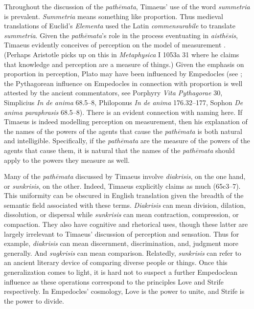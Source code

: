 Throughout the discussion of the \emph{pathēmata}, Timaeus' use of the word \emph{summetria} is prevalent. \emph{Summetria} means something like proportion. Thus medieval translations of Euclid's \emph{Elementa} used the Latin \emph{commensurabile} to translate \emph{summetria}. Given the \emph{pathēmata}'s role in the process eventuating in \emph{aisthēsis}, Timaeus evidently conceives of perception on the model of measurement \citep[155--6]{Brisson:1997qr}. (Perhaps Aristotle picks up on this in \emph{Metaphysica} I 1053a 31 where he claims that knowledge and perception are a measure of things.) Given the emphasis on proportion in perception, Plato may have been influenced by Empedocles (see \citealt{Ierodiakonou:2005fk,Ierodiakonou:2005ly}; the Pythagorean influence on Empedocles in connection with proportion is well attested by the ancient commentators, see Porphyry \emph{Vita Pythagorae} 30, Simplicius \emph{In de anima} 68.5--8, Philoponus \emph{In de anima} 176.32--177, Sophon \emph{De anima paraphrasis} 68.5--8). There is an evident connection with naming here. If Timaeus is indeed modelling perception on measurement, then his explanation of the names of the powers of the agents that cause the \emph{pathēmata} is both natural and intelligible. Specifically, if the \emph{pathēmata} are the measure of the powers of the agents that cause them, it is natural that the names of the \emph{pathēmata} should apply to the powers they measure as well. 

Many of the \emph{pathēmata} discussed by Timaeus involve \emph{diakrisis}, on the one hand, or \emph{sunkrisis}, on the other. Indeed, Timaeus explicitly claims as much (65c3--7). This uniformity can be obscured in English translation given the breadth of the semantic field associated with these terms. \emph{Diakrisis} can mean division, dilation, dissolution, or dispersal while \emph{sunkrisis} can mean contraction, compression, or compaction. They also have cognitive and rhetorical uses, though these latter are largely irrelevant to Timaeus' discussion of perception and sensation. Thus for example, \emph{diakrisis} can mean discernment, discrimination, and, judgment more generally. And \emph{sugkrisis} can mean comparison. Relatedly, \emph{sunkrisis} can refer to an ancient literary device of comparing diverse people or things. Once this generalization comes to light, it is hard not to suspect a further Empedoclean influence as these operations correspond to the principles Love and Strife respectively. In Empedocles' cosmology, Love is the power to unite, and Strife is the power to divide.


